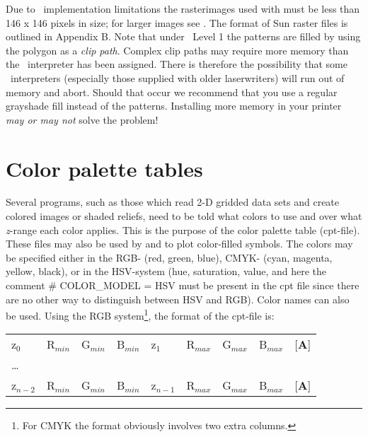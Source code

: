 Due to \PS\ implementation limitations the rasterimages used with
 must be less than 146 x 146 pixels in size; for larger images see
.  The format of Sun raster files is outlined in Appendix B.
Note that under \PS\ Level 1 the patterns are filled by using
the polygon as a \emph{clip path}.  Complex clip paths may require
more memory than the \PS\ interpreter has been assigned.
There is therefore the possibility that some \PS\ interpreters
(especially those supplied with older laserwriters) will run out of memory
and abort.  Should that occur we recommend that you use a regular grayshade
fill instead of the patterns.  Installing more memory in your printer
\emph{may or may not} solve the problem! 

\section{Color palette tables}


Several programs, such as those which read 2-D gridded data sets and create
colored images or shaded reliefs, need to be told what colors to use and
over what {\it z}-range each color applies.  This is the purpose of the
color palette table (cpt-file).  These files may also be used by 
and  to plot color-filled symbols.
The colors may be specified either in the RGB- (red, green, blue), CMYK- (cyan,
magenta, yellow, black), or in the HSV-system (hue, saturation, value, and
here the comment \# COLOR\_MODEL = HSV must be present in the cpt file since there
are no other way to distinguish between HSV and RGB).  Color names can also be used.
Using the RGB system\footnote{For CMYK the format obviously involves two extra columns.},
the format of the cpt-file is: 

\begin{center}
\begin{tabular}{lllllllll}
z$_0$ &  R$_{min}$ &  G$_{min}$ &  B$_{min}$ &  z$_1$ & R$_{max}$ &  G$_{max}$ &  B$_{max}$ &  [{\bf A}] \\ 
\ldots & & & & & & & & \\ 
z$_{n-2}$ &  R$_{min}$ &  G$_{min}$ &  B$_{min}$ &  z$_{n-1}$ &  R$_{max}$ &  G$_{max}$ &  B$_{max}$ &  [{\bf A}] \\
\end{tabular} 
\end{center}

